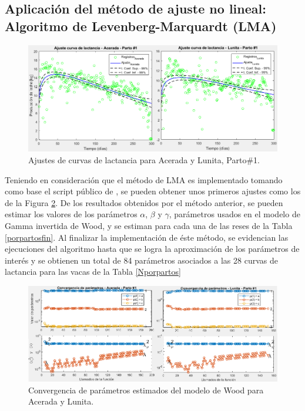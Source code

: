 \subsection{Aplicación del método de ajuste no lineal: Algoritmo de Levenberg-Marquardt (LMA)}

\begin{figure}[H]
	 \begin{center}
	 \includegraphics[scale=0.576904]{img/lev1p1.png}
	 \end{center}
	 \caption{Ajustes de curvas de lactancia para Acerada y Lunita, Parto\#1.  \label{levenberg1}}
\end{figure}

Teniendo en consideración que el método de LMA es implementado tomando como base el script público de \cite{levenberduke}, se pueden obtener unos primeros ajustes como los de la Figura \ref{levenberg1}. De los resultados obtenidos por el método anterior, se pueden estimar los valores de los parámetros $\alpha$, $\beta$ y $\gamma$, parámetros usados en el modelo de Gamma invertida de Wood, y se estiman para cada una de las reses de la Tabla \ref{porpartosfin}. Al finalizar la implementación de éste método, se evidencian las ejecuciones del algoritmo hasta que se logra la aproximación de los parámetros de interés y se obtienen un total de 84 parámetros asociados a las 28 curvas de lactancia para las vacas de la Tabla \ref{Nporpartos}

\begin{figure}[H]
	 \begin{center}
	 \includegraphics[scale=0.57904]{img/parslev1.png}
	 \end{center}
	 \caption{Convergencia de parámetros estimados del modelo de Wood para Acerada y Lunita. \label{levenberg1}}
\end{figure}

